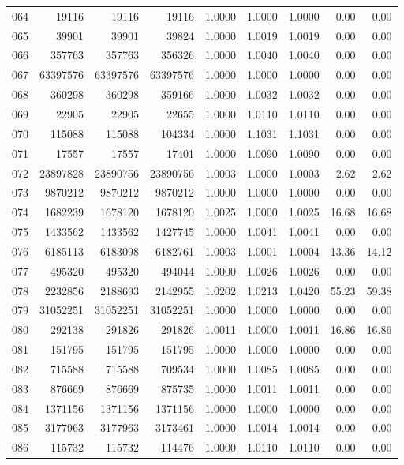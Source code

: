 \begin{longtable}{crrrrrrrr}
064 & 19116 & 19116 & 19116 & 1.0000 & 1.0000 & 1.0000 & 0.00 & 0.00 \\
065 & 39901 & 39901 & 39824 & 1.0000 & 1.0019 & 1.0019 & 0.00 & 0.00 \\
066 & 357763 & 357763 & 356326 & 1.0000 & 1.0040 & 1.0040 & 0.00 & 0.00 \\
067 & 63397576 & 63397576 & 63397576 & 1.0000 & 1.0000 & 1.0000 & 0.00 & 0.00 \\
068 & 360298 & 360298 & 359166 & 1.0000 & 1.0032 & 1.0032 & 0.00 & 0.00 \\
069 & 22905 & 22905 & 22655 & 1.0000 & 1.0110 & 1.0110 & 0.00 & 0.00 \\
070 & 115088 & 115088 & 104334 & 1.0000 & 1.1031 & 1.1031 & 0.00 & 0.00 \\
071 & 17557 & 17557 & 17401 & 1.0000 & 1.0090 & 1.0090 & 0.00 & 0.00 \\
072 & 23897828 & 23890756 & 23890756 & 1.0003 & 1.0000 & 1.0003 & 2.62 & 2.62 \\
073 & 9870212 & 9870212 & 9870212 & 1.0000 & 1.0000 & 1.0000 & 0.00 & 0.00 \\
074 & 1682239 & 1678120 & 1678120 & 1.0025 & 1.0000 & 1.0025 & 16.68 & 16.68 \\
075 & 1433562 & 1433562 & 1427745 & 1.0000 & 1.0041 & 1.0041 & 0.00 & 0.00 \\
076 & 6185113 & 6183098 & 6182761 & 1.0003 & 1.0001 & 1.0004 & 13.36 & 14.12 \\
077 & 495320 & 495320 & 494044 & 1.0000 & 1.0026 & 1.0026 & 0.00 & 0.00 \\
078 & 2232856 & 2188693 & 2142955 & 1.0202 & 1.0213 & 1.0420 & 55.23 & 59.38 \\
079 & 31052251 & 31052251 & 31052251 & 1.0000 & 1.0000 & 1.0000 & 0.00 & 0.00 \\
080 & 292138 & 291826 & 291826 & 1.0011 & 1.0000 & 1.0011 & 16.86 & 16.86 \\
081 & 151795 & 151795 & 151795 & 1.0000 & 1.0000 & 1.0000 & 0.00 & 0.00 \\
082 & 715588 & 715588 & 709534 & 1.0000 & 1.0085 & 1.0085 & 0.00 & 0.00 \\
083 & 876669 & 876669 & 875735 & 1.0000 & 1.0011 & 1.0011 & 0.00 & 0.00 \\
084 & 1371156 & 1371156 & 1371156 & 1.0000 & 1.0000 & 1.0000 & 0.00 & 0.00 \\
085 & 3177963 & 3177963 & 3173461 & 1.0000 & 1.0014 & 1.0014 & 0.00 & 0.00 \\
086 & 115732 & 115732 & 114476 & 1.0000 & 1.0110 & 1.0110 & 0.00 & 0.00 \\

\end{longtable}
